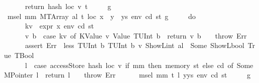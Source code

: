 \begin{isabellebody}
\ \ \ \ \ \ return\ {\isacharparenleft}{\kern0pt}hash\ loc\ v{\isacharcomma}{\kern0pt}\ t{\isacharparenright}{\kern0pt}\isanewline
\ \ \ \ {\isacharbraceright}{\kern0pt}{\isacharparenright}{\kern0pt}\ g{\isachardoublequoteclose}\isanewline
\isanewline
{\isacharbar}{\kern0pt}\ {\isachardoublequoteopen}msel\ mm\ {\isacharparenleft}{\kern0pt}MTArray\ al\ t{\isacharparenright}{\kern0pt}\ loc\ {\isacharparenleft}{\kern0pt}x\ {\isacharhash}{\kern0pt}\ y\ {\isacharhash}{\kern0pt}\ ys{\isacharparenright}{\kern0pt}\ env\ cd\ st\ g\ {\isacharequal}{\kern0pt}\isanewline
\ \ \ \ {\isacharparenleft}{\kern0pt}do\ {\isacharbraceleft}{\kern0pt}\isanewline
\ \ \ \ \ \ kv\ {\isasymleftarrow}\ expr\ x\ env\ cd\ st{\isacharsemicolon}{\kern0pt}\isanewline
\ \ \ \ \ \ {\isacharparenleft}{\kern0pt}v{\isacharcomma}{\kern0pt}\ b{\isacharparenright}{\kern0pt}\ {\isasymleftarrow}\ case\ kv\ of\ {\isacharparenleft}{\kern0pt}KValue\ v{\isacharcomma}{\kern0pt}\ Value\ {\isacharparenleft}{\kern0pt}TUInt\ b{\isacharparenright}{\kern0pt}{\isacharparenright}{\kern0pt}\ {\isasymRightarrow}\ return\ {\isacharparenleft}{\kern0pt}v{\isacharcomma}{\kern0pt}\ b{\isacharparenright}{\kern0pt}\ {\isacharbar}{\kern0pt}\ {\isacharunderscore}{\kern0pt}\ {\isasymRightarrow}\ throw\ Err{\isacharsemicolon}{\kern0pt}\isanewline
\ \ \ \ \ \ assert\ Err\ {\isacharparenleft}{\kern0pt}{\isasymlambda}{\isacharunderscore}{\kern0pt}{\isachardot}{\kern0pt}\ less\ {\isacharparenleft}{\kern0pt}TUInt\ b{\isacharparenright}{\kern0pt}\ {\isacharparenleft}{\kern0pt}TUInt\ b{}{}{}{\isacharparenright}{\kern0pt}\ v\ {\isacharparenleft}{\kern0pt}ShowL\isactrlsub i\isactrlsub n\isactrlsub t\ al{\isacharparenright}{\kern0pt}\ {\isacharequal}{\kern0pt}\ Some\ {\isacharparenleft}{\kern0pt}ShowL\isactrlsub b\isactrlsub o\isactrlsub o\isactrlsub l\ True{\isacharcomma}{\kern0pt}\ TBool{\isacharparenright}{\kern0pt}{\isacharparenright}{\kern0pt}{\isacharsemicolon}{\kern0pt}\isanewline
\ \ \ \ \ \ l\ {\isasymleftarrow}\ case\ accessStore\ {\isacharparenleft}{\kern0pt}hash\ loc\ v{\isacharparenright}{\kern0pt}\ {\isacharparenleft}{\kern0pt}if\ mm\ then\ memory\ st\ else\ cd{\isacharparenright}{\kern0pt}\ of\ Some\ {\isacharparenleft}{\kern0pt}MPointer\ l{\isacharparenright}{\kern0pt}\ {\isasymRightarrow}\ return\ l\ {\isacharbar}{\kern0pt}\ {\isacharunderscore}{\kern0pt}\ {\isasymRightarrow}\ throw\ Err{\isacharsemicolon}{\kern0pt}\isanewline
\ \ \ \ \ \ msel\ mm\ t\ l\ {\isacharparenleft}{\kern0pt}y{\isacharhash}{\kern0pt}ys{\isacharparenright}{\kern0pt}\ env\ cd\ st\isanewline
\ \ \ \ {\isacharbraceright}{\kern0pt}{\isacharparenright}{\kern0pt}\ g{\isachardoublequoteclose}\isanewline

\end{isabellebody}
